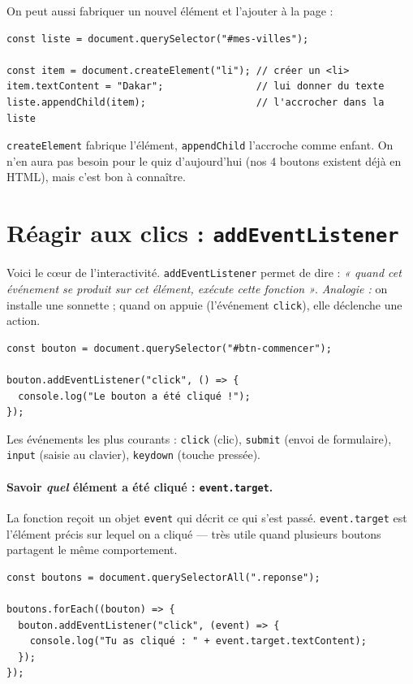 \documentclass[11pt,a4paper]{article}
\newcommand{\code}[1]{\texttt{#1}}
\begin{document}
On peut aussi fabriquer un nouvel élément et l'ajouter à la page :

\begin{lstlisting}[style=js]
const liste = document.querySelector("#mes-villes");

const item = document.createElement("li"); // créer un <li>
item.textContent = "Dakar";                // lui donner du texte
liste.appendChild(item);                   // l'accrocher dans la liste
\end{lstlisting}

\code{createElement} fabrique l'élément, \code{appendChild} l'accroche comme enfant. On n'en aura pas besoin pour le quiz d'aujourd'hui (nos 4 boutons existent déjà en HTML), mais c'est bon à connaître.

\section{Réagir aux clics : \texttt{addEventListener}}

Voici le cœur de l'interactivité. \code{addEventListener} permet de dire : \emph{« quand cet événement se produit sur cet élément, exécute cette fonction »}. \emph{Analogie :} on installe une sonnette ; quand on appuie (l'événement \code{click}), elle déclenche une action.

\begin{lstlisting}[style=js]
const bouton = document.querySelector("#btn-commencer");

bouton.addEventListener("click", () => {
  console.log("Le bouton a été cliqué !");
});
\end{lstlisting}

Les événements les plus courants : \code{click} (clic), \code{submit} (envoi de formulaire), \code{input} (saisie au clavier), \code{keydown} (touche pressée).

\paragraph{Savoir \emph{quel} élément a été cliqué : \texttt{event.target}.} La fonction reçoit un objet \code{event} qui décrit ce qui s'est passé. \code{event.target} est l'élément précis sur lequel on a cliqué --- très utile quand plusieurs boutons partagent le même comportement.

\begin{lstlisting}[style=js]
const boutons = document.querySelectorAll(".reponse");

boutons.forEach((bouton) => {
  bouton.addEventListener("click", (event) => {
    console.log("Tu as cliqué : " + event.target.textContent);
  });
});
\end{lstlisting}
\end{document}
